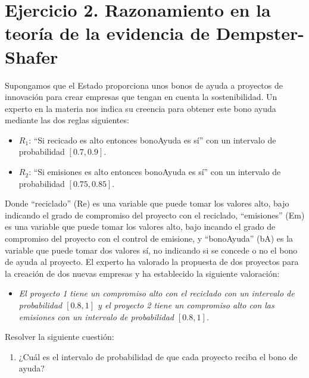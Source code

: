 \documentclass[11pt,a4paper]{article}
\begin{document}
\clearpage

\tableofcontents
\clearpage
{}

\section*{Ejercicio 2. Razonamiento en la teoría de la evidencia de Dempster-Shafer}

\noindent
Supongamos que el Estado proporciona unos bonos de ayuda a proyectos de innovación para crear empresas
que tengan en cuenta la sostenibilidad. Un experto en la materia nos indica su creencia para 
obtener este bono ayuda mediante las dos reglas siguientes:
\begin{itemize}[leftmargin=2em, topsep=1ex]
    \item $R_1$: ``Si recicado es alto entonces bonoAyuda es sí'' con un intervalo de probabilidad $[0.7, 0.9]$.
    \item $R_2$: ``Si emisiones es alto entonces bonoAyuda es sí'' con un intervalo de probabilidad $[0.75, 0.85]$.
\end{itemize}
\noindent
Donde ``reciclado'' (Re) es una variable que puede tomar los valores {alto, bajo}
indicando el grado de compromiso del proyecto con el reciclado, ``emisiones'' (Em) es una 
variable que puede tomar los valores {alto, bajo} incando el grado de compromiso
del proyecto con el control de emisione, y ``bonoAyuda'' (bA) es la variable que puede tomar 
dos valores {sí, no} indicando si se concede o no el bono de ayuda al proyecto. 
\noindent
El experto ha valorado la propuesta de dos proyectos para la creación de dos nuevas empresas y 
ha establecido la siguiente valoración:
\begin{itemize}[leftmargin=2em, topsep=1ex]
    \item[] \textit{El proyecto 1 tiene un compromiso alto con el reciclado con un intervalo
     de probabilidad $[0.8, 1]$ y el proyecto 2 tiene un compromiso alto con las emisiones 
     con un intervalo de probabilidad $[0.8, 1]$.}
\end{itemize}
\noindent
Resolver la siguiente cuestión:
\begin{enumerate}[leftmargin=2em, topsep=1ex, label=\alph*)]
    \item ¿Cuál es el intervalo de probabilidad de que cada proyecto reciba el bono de ayuda?
\end{enumerate}
\end{document}
